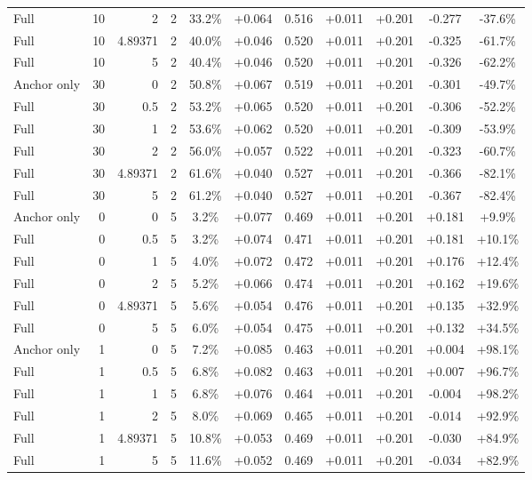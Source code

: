 \begin{table}[htbp]
\begin{tabular}{lrrrccccccc}
Full & 10 & 2 & 2 & 33.2\% & +0.064 & 0.516 & +0.011 & +0.201 & -0.277 & -37.6\% \\
Full & 10 & 4.89371 & 2 & 40.0\% & +0.046 & 0.520 & +0.011 & +0.201 & -0.325 & -61.7\% \\
Full & 10 & 5 & 2 & 40.4\% & +0.046 & 0.520 & +0.011 & +0.201 & -0.326 & -62.2\% \\
Anchor only & 30 & 0 & 2 & 50.8\% & +0.067 & 0.519 & +0.011 & +0.201 & -0.301 & -49.7\% \\
Full & 30 & 0.5 & 2 & 53.2\% & +0.065 & 0.520 & +0.011 & +0.201 & -0.306 & -52.2\% \\
Full & 30 & 1 & 2 & 53.6\% & +0.062 & 0.520 & +0.011 & +0.201 & -0.309 & -53.9\% \\
Full & 30 & 2 & 2 & 56.0\% & +0.057 & 0.522 & +0.011 & +0.201 & -0.323 & -60.7\% \\
Full & 30 & 4.89371 & 2 & 61.6\% & +0.040 & 0.527 & +0.011 & +0.201 & -0.366 & -82.1\% \\
Full & 30 & 5 & 2 & 61.2\% & +0.040 & 0.527 & +0.011 & +0.201 & -0.367 & -82.4\% \\
Anchor only & 0 & 0 & 5 & 3.2\% & +0.077 & 0.469 & +0.011 & +0.201 & +0.181 & +9.9\% \\
Full & 0 & 0.5 & 5 & 3.2\% & +0.074 & 0.471 & +0.011 & +0.201 & +0.181 & +10.1\% \\
Full & 0 & 1 & 5 & 4.0\% & +0.072 & 0.472 & +0.011 & +0.201 & +0.176 & +12.4\% \\
Full & 0 & 2 & 5 & 5.2\% & +0.066 & 0.474 & +0.011 & +0.201 & +0.162 & +19.6\% \\
Full & 0 & 4.89371 & 5 & 5.6\% & +0.054 & 0.476 & +0.011 & +0.201 & +0.135 & +32.9\% \\
Full & 0 & 5 & 5 & 6.0\% & +0.054 & 0.475 & +0.011 & +0.201 & +0.132 & +34.5\% \\
Anchor only & 1 & 0 & 5 & 7.2\% & +0.085 & 0.463 & +0.011 & +0.201 & +0.004 & +98.1\% \\
Full & 1 & 0.5 & 5 & 6.8\% & +0.082 & 0.463 & +0.011 & +0.201 & +0.007 & +96.7\% \\
Full & 1 & 1 & 5 & 6.8\% & +0.076 & 0.464 & +0.011 & +0.201 & -0.004 & +98.2\% \\
Full & 1 & 2 & 5 & 8.0\% & +0.069 & 0.465 & +0.011 & +0.201 & -0.014 & +92.9\% \\
Full & 1 & 4.89371 & 5 & 10.8\% & +0.053 & 0.469 & +0.011 & +0.201 & -0.030 & +84.9\% \\
Full & 1 & 5 & 5 & 11.6\% & +0.052 & 0.469 & +0.011 & +0.201 & -0.034 & +82.9\% \\

\end{tabular}
\end{table}
